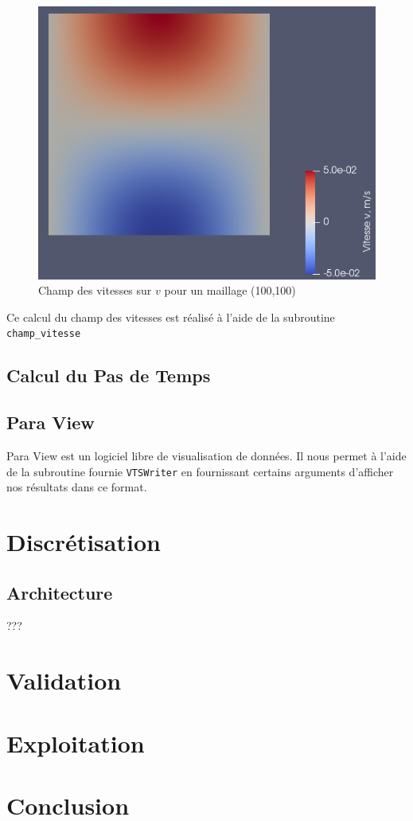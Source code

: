 \documentclass[a4paper,oneside]{article}
\begin{document}
\begin{figure}[h!]
	\centering
        \includegraphics[scale=0.4]{Champ_Vitesse_Maillage/Champ_Vitesse_v.png}
        \caption{Champ des vitesses sur $v$ pour un maillage (100,100)}
\end{figure}

Ce calcul du champ des vitesses est réalisé à l'aide de la subroutine \verb?champ_vitesse?

\subsection{Calcul du Pas de Temps}

\subsection{Para View}

Para View est un logiciel libre de visualisation de données. 
Il nous permet à l'aide de la subroutine fournie \verb?VTSWriter? en fournissant certains arguments d'afficher nos résultats dans ce format.

\section{Discrétisation}

\subsection{Architecture}
???





\section{Validation}


\section{Exploitation}


\section{Conclusion}
\end{document}

